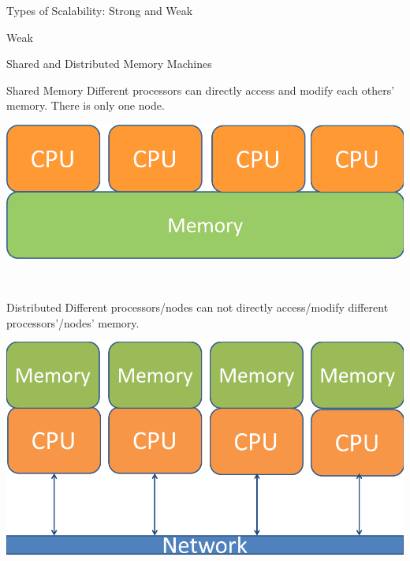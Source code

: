\begin{frame}
\begin{block}{Types of Scalability:  Strong and Weak}
\begin{center}
\begin{minipage}{.475\textwidth}
\begin{block}{Weak}
    \end{block}
    \end{minipage}
    \end{center}
    \end{block}
\end{frame}




\begin{frame}
  \begin{block}{Shared and Distributed Memory Machines}
   \begin{center}
    \begin{minipage}{.475\textwidth}
    \begin{block}{Shared Memory}
    Different processors can directly access and modify each others' memory.  There is only one node.
      \begin{center}
      \includegraphics[width=.95\textwidth]{pics/arch_shared}
      \end{center}
      \vspace{.4cm} \ 
    \end{block}
    \end{minipage}
    \hspace{.1cm}
    \begin{minipage}{.475\textwidth}
    \begin{block}{Distributed}
    Different processors/nodes can not directly access/modify different processors'/nodes' memory.
      \begin{center}
      \includegraphics[width=.95\textwidth]{pics/arch_distributed}
      \end{center}
    \end{block}
    \end{minipage}
    \end{center}
    \end{block}
\end{frame}


